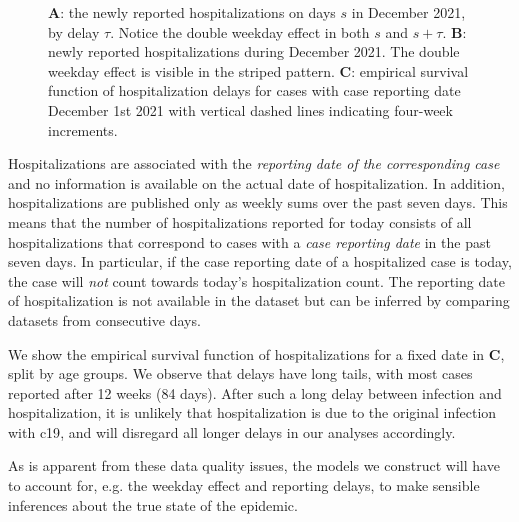 \begin{figure}
    \resizebox{\textwidth}{!}{%
    }
    \caption{\textbf{A}: the newly reported hospitalizations on days $s$ in December 2021, by delay $\tau$. Notice the double weekday effect in both $s$ and $s+\tau$. \textbf{B}: newly reported hospitalizations during December 2021. The double weekday effect is visible in the striped pattern. \textbf{C}: empirical survival function of hospitalization delays for cases with case reporting date December 1st 2021 with vertical dashed lines indicating four-week increments.}
    \label{fig:double_weekday_effect_hosp}
\end{figure}

Hospitalizations are associated with the \emph{reporting date of the corresponding case} and no information is available on the actual date of hospitalization. In addition, hospitalizations are published only as weekly sums over the past seven days. This means that the number of hospitalizations reported for today consists of all hospitalizations that correspond to cases with a \emph{case reporting date} in the past seven days. In particular, if the case reporting date of a hospitalized case is today, the case will \emph{not} count towards today's hospitalization count. The reporting date of hospitalization is not available in the dataset but can be inferred by comparing datasets from consecutive days.

We show the empirical survival function of hospitalizations for a fixed date in  \textbf{C}, split by age groups. We observe that delays have long tails, with most cases reported after 12 weeks (84 days). After such a long delay between infection and hospitalization, it is unlikely that hospitalization is due to the original infection with \gls{c19}, and will disregard all longer delays in our analyses accordingly. 

As is apparent from these data quality issues, the models we construct will have to account for, e.g. the weekday effect and reporting delays, to make sensible inferences about the true state of the epidemic. 